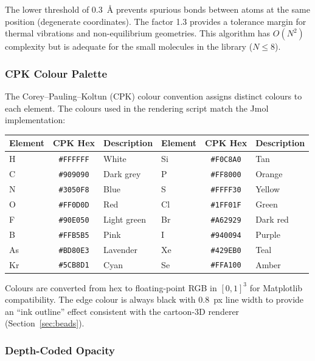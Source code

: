 \documentclass[11pt,a4paper]{article}
\begin{document}
The lower threshold of 0.3~\AA{} prevents spurious bonds between atoms
at the same position (degenerate coordinates).  The factor 1.3 provides
a tolerance margin for thermal vibrations and non-equilibrium geometries.
This algorithm has $O(N^2)$ complexity but is adequate for the small
molecules in the library ($N \leq 8$).

\subsubsection{CPK Colour Palette}

The Corey--Pauling--Koltun (CPK) colour convention assigns distinct
colours to each element.  The colours used in the rendering script match
the Jmol implementation:

\begin{center}
\begin{tabular}{lcl|lcl}
\toprule
\textbf{Element} & \textbf{CPK Hex} & \textbf{Description}
& \textbf{Element} & \textbf{CPK Hex} & \textbf{Description} \\
\midrule
H  & \texttt{\#FFFFFF} & White       & Si & \texttt{\#F0C8A0} & Tan \\
C  & \texttt{\#909090} & Dark grey   & P  & \texttt{\#FF8000} & Orange \\
N  & \texttt{\#3050F8} & Blue        & S  & \texttt{\#FFFF30} & Yellow \\
O  & \texttt{\#FF0D0D} & Red         & Cl & \texttt{\#1FF01F} & Green \\
F  & \texttt{\#90E050} & Light green & Br & \texttt{\#A62929} & Dark red \\
B  & \texttt{\#FFB5B5} & Pink        & I  & \texttt{\#940094} & Purple \\
As & \texttt{\#BD80E3} & Lavender    & Xe & \texttt{\#429EB0} & Teal \\
Kr & \texttt{\#5CB8D1} & Cyan        & Se & \texttt{\#FFA100} & Amber \\
\bottomrule
\end{tabular}
\end{center}

\noindent Colours are converted from hex to floating-point RGB in $[0,1]^3$
for Matplotlib compatibility.  The edge colour is always black with 0.8~px
line width to provide an ``ink outline'' effect consistent with the
cartoon-3D renderer (Section~\ref{sec:beads}).

\subsubsection{Depth-Coded Opacity}
\end{document}
